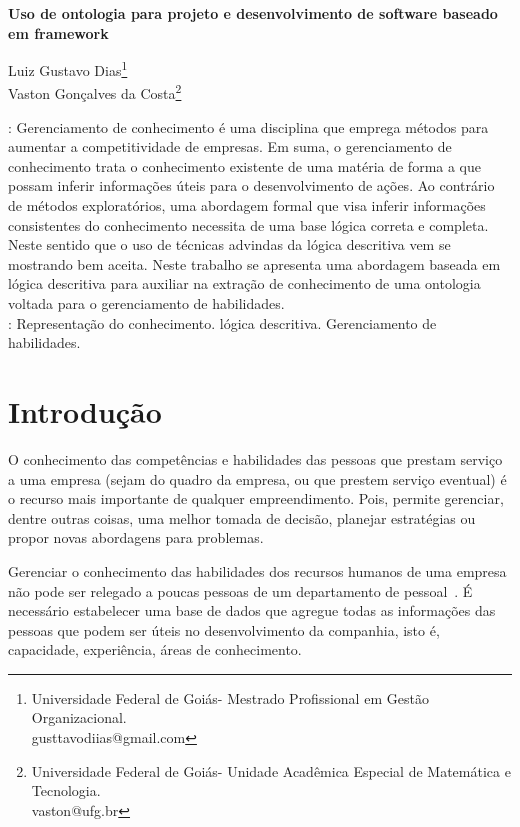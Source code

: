 \documentclass[hyphens,11pt,a4paper]{article}
\begin{document}
\pagestyle{empty}
\begin{center}
{\bf Uso de ontologia para projeto e desenvolvimento de software baseado em framework } 
\end{center}

\begin{flushright}
Luiz Gustavo Dias\footnote{Universidade Federal de Goiás- Mestrado Profissional em Gestão Organizacional.\\ gusttavodiias@gmail.com}\\[.01cm]
Vaston Gonçalves da Costa\footnote{Universidade Federal de Goiás- Unidade Acadêmica Especial de Matemática e Tecnologia.\\ vaston@ufg.br}
\end {flushright}

{\footnotesize
{}: Gerenciamento de conhecimento é uma disciplina que emprega métodos para aumentar a competitividade de empresas. Em suma, o gerenciamento de conhecimento trata o conhecimento existente de uma matéria de forma a que possam inferir informações úteis para o desenvolvimento de ações. Ao contrário de métodos exploratórios, uma abordagem formal que visa inferir informações consistentes do conhecimento necessita de uma base lógica correta e completa. Neste sentido que o uso de técnicas advindas da lógica descritiva vem se mostrando bem aceita. Neste trabalho se apresenta uma abordagem baseada em lógica descritiva para auxiliar na extração de conhecimento de uma ontologia voltada para o gerenciamento de habilidades.
\\[.2cm]
: Representação do conhecimento. lógica descritiva. Gerenciamento de habilidades. }

\section*{Introdução}

O conhecimento das competências e habilidades das pessoas que prestam serviço a uma empresa (sejam do quadro da empresa, ou que prestem serviço eventual) é o recurso mais importante de qualquer empreendimento. Pois, permite gerenciar, dentre outras coisas, uma melhor tomada de decisão, planejar estratégias ou propor novas abordagens para problemas. 

Gerenciar o conhecimento das habilidades dos recursos humanos de uma empresa não pode ser relegado a poucas pessoas de um departamento de pessoal~\cite{}. É necessário  estabelecer uma base de dados que agregue todas as informações das pessoas que podem ser úteis no desenvolvimento da companhia, isto é, capacidade, experiência, áreas de conhecimento.
\end{document}
